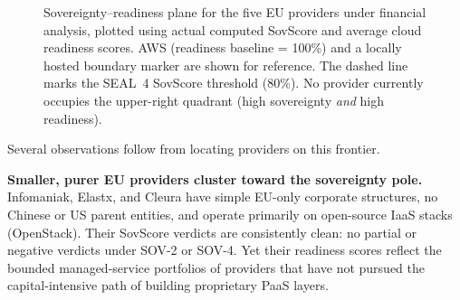 \begin{figure}[htbp]
  \centering
  \caption{Sovereignty--readiness plane for the five EU providers under financial analysis, plotted using actual computed SovScore and average cloud readiness scores. AWS (readiness baseline = 100\%) and a locally hosted boundary marker are shown for reference. The dashed line marks the SEAL~4 SovScore threshold (80\%). No provider currently occupies the upper-right quadrant (high sovereignty \emph{and} high readiness).}
  \label{fig:sov_readiness_frontier}
\end{figure}

Several observations follow from locating providers on this frontier.

\textbf{Smaller, purer EU providers cluster toward the sovereignty pole.} Infomaniak, Elastx, and Cleura have simple EU-only corporate structures, no Chinese or US parent entities, and operate primarily on open-source IaaS stacks (OpenStack). Their SovScore verdicts are consistently clean: no partial or negative verdicts under SOV-2 or SOV-4. Yet their readiness scores reflect the bounded managed-service portfolios of providers that have not pursued the capital-intensive path of building proprietary PaaS layers.

